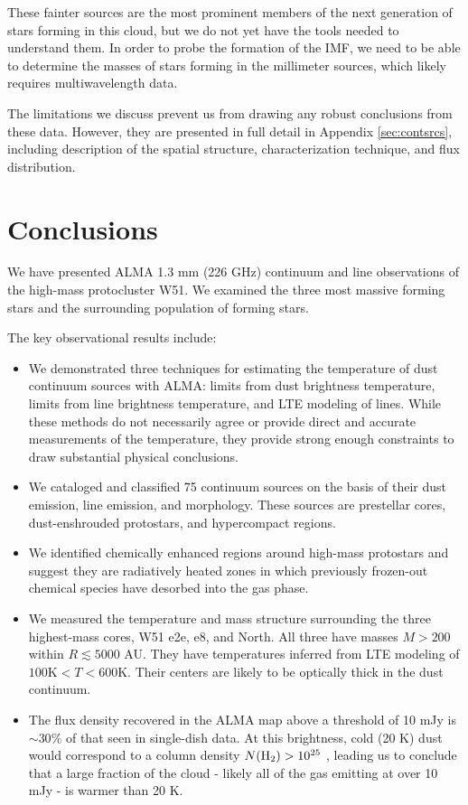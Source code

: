 \documentclass{emulateapj}
\begin{document}
These fainter sources are the most prominent members of the next generation of
stars forming in this cloud, but we do not yet have the tools needed to
understand them.  In order to probe the formation of the IMF, we need to be
able to determine the masses of stars forming in the millimeter sources, which
likely requires multiwavelength data.  

The limitations we discuss prevent us from drawing any robust conclusions from
these data.  However, they are presented in full detail in Appendix
\ref{sec:contsrcs}, including description of the spatial structure,
characterization technique, and flux distribution.



\section{Conclusions}
\label{sec:conclusion}

We have presented ALMA 1.3 mm (226 GHz) continuum and line observations of the
high-mass protocluster W51.  We examined the three most massive forming stars
and the surrounding population of forming stars.  


The key observational results include:
\begin{itemize}
    \item We demonstrated three techniques for estimating the temperature of
        dust continuum sources with ALMA: limits from dust brightness
        temperature, limits from line brightness temperature, and LTE modeling
        of \methanol lines.  While these methods do not necessarily agree
        or provide direct and accurate measurements of the temperature, they
        provide strong enough constraints to draw substantial physical conclusions.
    \item We cataloged and classified 75 continuum sources on the basis of their
        dust emission, line emission, and morphology.  These sources are
        prestellar cores, dust-enshrouded protostars, and hypercompact \hii
        regions.
    \item We identified chemically enhanced regions around high-mass protostars
        and suggest they are radiatively heated zones in which previously
        frozen-out chemical species have desorbed into the gas phase.
    \item We measured the temperature and mass structure surrounding the three
        highest-mass cores, W51 e2e, e8, and North.  All three have masses
        $M>200$ \msun within $R\lesssim5000$ AU.  They have temperatures
        inferred from LTE modeling of \methanol $100 \mathrm{K} < T < 600
        \mathrm{K}$.  Their centers are likely to be optically thick in
        the dust continuum.
    \item The flux density recovered in the ALMA map above a threshold of 10
        mJy \perbeam  is $\sim30\%$ of that seen in single-dish data.  At this
        brightness, cold (20 K) dust would correspond to a column density
        $N(\textrm{H}_{2})>10^{25}$ \persc, leading us to conclude that a large fraction
        of the cloud - likely all of the gas emitting at over 10 mJy \perbeam -
        is warmer than 20 K.
\end{itemize}
\end{document}
